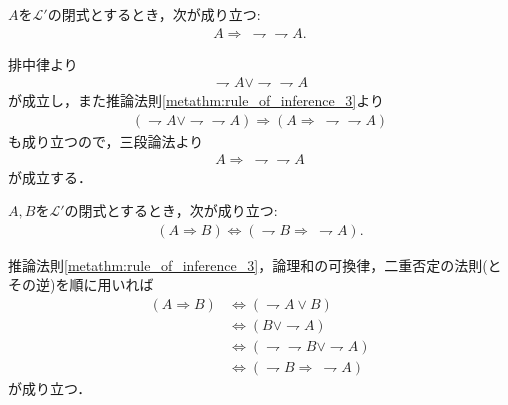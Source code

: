 	\begin{screen}
		\begin{metathm}[二重否定の法則の逆が成り立つ]
			$A$を$\mathcal{L}'$の閉式とするとき，次が成り立つ:
			\begin{align}
				A \Longrightarrow\ \rightharpoondown \rightharpoondown A.
			\end{align}
		\end{metathm}
	\end{screen}
	
	\begin{prf}
		排中律より
		\begin{align}
			\rightharpoondown A \vee \rightharpoondown \rightharpoondown A
		\end{align}
		が成立し，また推論法則\ref{metathm:rule_of_inference_3}より
		\begin{align}
			(\rightharpoondown A \vee \rightharpoondown \rightharpoondown A)
			\Longrightarrow (A \Longrightarrow\ \rightharpoondown \rightharpoondown A)
		\end{align}
		も成り立つので，三段論法より
		\begin{align}
			A \Longrightarrow\ \rightharpoondown \rightharpoondown A
		\end{align}
		が成立する．
		\QED
	\end{prf}
	
	\begin{screen}
		\begin{metathm}[対偶命題は同値]\label{thm:contraposition_is_true}
			$A,B$を$\mathcal{L}'$の閉式とするとき，次が成り立つ:
			\begin{align}
				(A \Longrightarrow B) \Longleftrightarrow (\rightharpoondown B \Longrightarrow\ \rightharpoondown A).
			\end{align}
		\end{metathm}
	\end{screen}
	
	\begin{prf}
		推論法則\ref{metathm:rule_of_inference_3}，論理和の可換律，二重否定の法則(とその逆)を順に用いれば
		\begin{align}
			(A \Longrightarrow B) &\Longleftrightarrow (\rightharpoondown A \vee B) \\
			&\Longleftrightarrow (B \vee \rightharpoondown A) \\
			&\Longleftrightarrow (\rightharpoondown \rightharpoondown B \vee \rightharpoondown A) \\
			&\Longleftrightarrow (\rightharpoondown B \Longrightarrow\ \rightharpoondown A)
		\end{align}
		が成り立つ．
		\QED
	\end{prf}
	
